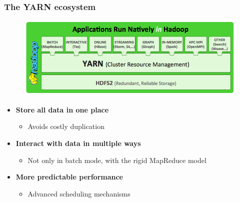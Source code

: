 \begin{frame}
\frametitle{The YARN ecosystem}
\begin{figure}[h]
  \centering
  \includegraphics[scale=0.4]{./figures/yarn_ecosystem}
  \label{fig:yarn_ecosystem}
\end{figure}
\begin{itemize}
  \item {\bf Store all data in one place}
  \begin{itemize}
    \item Avoids costly duplication
  \end{itemize}
  \item {\bf Interact with data in multiple ways}
  \begin{itemize}
    \item Not only in batch mode, with the rigid MapReduce model
  \end{itemize}
  \item {\bf More predictable performance}
  \begin{itemize}
    \item Advanced scheduling mechanisms
  \end{itemize}
\end{itemize}
\end{frame}

